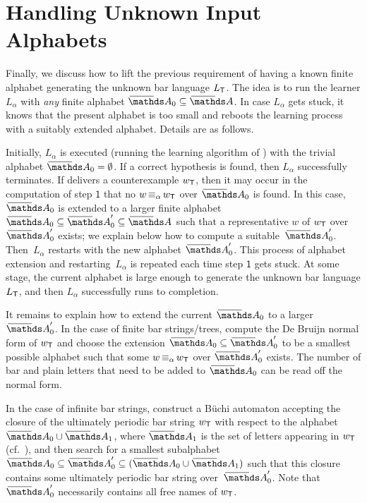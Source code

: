 \documentclass[a4paper,UKenglish,cleveref,autoref,thm-restate,numberwithinsect,final]{lipics-v2021}
\begin{document}
    \section{Handling Unknown Input Alphabets} \label{sec:alphabet}

    Finally, we discuss how to lift the previous requirement of having a known finite
    alphabet generating the unknown bar language $L_\textsf{T}$. The idea is to run the learner $L_\alpha$ with \emph{any} finite alphabet $\barNames_0\seq \barNames$. In case $L_\alpha$ gets stuck, it knows that the present alphabet is too small and reboots the learning process with a suitably extended alphabet. Details are as follows.

Initially, $L_\alpha$ is executed (running the learning algorithm of ) with
the trivial alphabet $\barNames_0=\emptyset$. If a correct hypothesis is found, then $L_\alpha$
successfully terminates. If \teach delivers a counterexample $w_\textsf{T}$, then it may occur in the computation of step $\mathsf{1}$ that no $w\operatorname{\equiv_{\alpha}} w_\textsf{T}$ over $\barNames_0$ is found. In this case, $\barNames_0$ is extended to a larger finite alphabet  $\barNames_0\seq \barNames_0'\seq \barNames$ such that a representative $w$ of $w_\textsf{T}$ over $\barNames_0'$ exists; we explain below how to compute a suitable~$\barNames_0'$. Then~$L_\alpha$ restarts with the new alphabet $\barNames_0'$. This process of alphabet extension and restarting~$L_\alpha$ is repeated each time step $\mathsf{1}$ gets stuck. At some stage, the current alphabet is large enough to generate the unknown bar language $L_\textsf{T}$, and then $L_\alpha$ successfully runs to completion.

It remains to explain how to extend the current $\barNames_0$ to a larger $\barNames_0'$. In the case of finite bar strings/trees, compute the De Bruijn normal form of $w_\textsf{T}$ and choose the extension $\barNames_0\seq \barNames_0'$ to be a smallest possible alphabet such that some $w\operatorname{\equiv_{\alpha}} w_\textsf{T}$ over $\barNames_0'$ exists. The number of bar and plain letters that need to be added to $\barNames_0$ can be read off the normal form.

 In the case of infinite bar strings, construct a Büchi automaton accepting the closure of the ultimately periodic bar string $w_\textsf{T}$ with respect to the alphabet $\barNames_0\cup \barNames_1$, where $\barNames_1$ is the set of letters appearing in $w_\textsf{T}$ (cf.\ ), and then search for a smallest subalphabet $\barNames_0\seq\barNames_0'\seq (\barNames_0\cup\barNames_1)$%
 such that this closure contains some ultimately periodic bar string over~$\barNames_0'$. Note that $\barNames_0'$ necessarily contains all free names of $w_\textsf{T}$.
\end{document}
